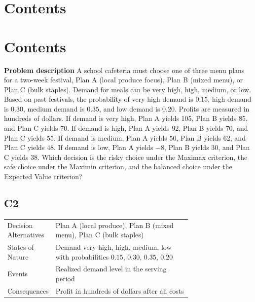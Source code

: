 


\section*{Contents}
\setcounter{tocdepth}{2}
\setcounter{secnumdepth}{1}
\section*{Contents}
\setcounter{tocdepth}{2}
\setcounter{secnumdepth}{1}
\tableofcontents
		\textbf{Problem description}
		A school cafeteria must choose one of three menu plans for a two-week festival, Plan A (local produce focus),
		Plan B (mixed menu), or Plan C (bulk staples). Demand for meals can be very high, high, medium, or low. Based on past festivals, the probability of very high demand is $0.15$, high demand is $0.30$, medium demand is $0.35$, and low demand is $0.20$. Profits are measured in hundreds of dollars. If demand is very high, Plan A yields 105, Plan B yields 85, and Plan C yields 70. If demand is high, Plan A yields 92, Plan B yields 70, and Plan C yields 55. If demand is medium, Plan A yields 50, Plan B yields 62, and Plan C yields 48. If demand is low, Plan A yields $-8$, Plan B yields 30, and Plan C yields 38. Which decision is the risky choice under the Maximax criterion, the safe choice under the Maximin criterion, and the balanced choice under the Expected Value criterion?

		\subsection*{C2}
		\begin{center}
			\begin{tabular}{l p{0.74\linewidth}}
				\toprule
				Decision Alternatives & Plan A (local produce), Plan B (mixed menu), Plan C (bulk staples) \\
				States of Nature & Demand very high, high, medium, low with probabilities $0.15$, $0.30$, $0.35$, $0.20$ \\
				Events & Realized demand level in the serving period \\
				Consequences & Profit in hundreds of dollars after all costs \\
				\bottomrule
			\end{tabular}
		\end{center}

